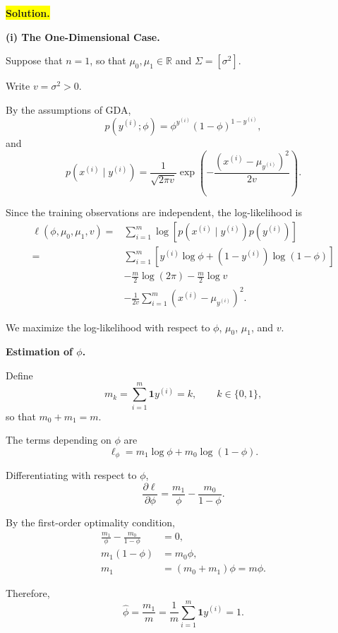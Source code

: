\documentclass[10pt]{article}
\newcommand{\ind}{\mathbf{1}}
\begin{document}
\begin{enumerate}
\begin{enumerate}[label=(\alph*)]

\medskip
\noindent\colorbox{yellow}{\textbf{Solution.}}

\medskip
\noindent\colorbox{yellow!20}{\textbf{(i) The One-Dimensional Case.}}

Suppose that $n=1$, so that
$\mu_0,\mu_1\in\mathbb{R}$ and
$\Sigma=[\sigma^2]$.

Write $v=\sigma^2>0$.

By the assumptions of GDA,
\[
p(y^{(i)};\phi)
=
\phi^{y^{(i)}}(1-\phi)^{1-y^{(i)}},
\]
and
\[
p(x^{(i)}\mid y^{(i)})
=
\frac{1}{\sqrt{2\pi v}}
\exp\left(
-\frac{
(x^{(i)}-\mu_{y^{(i)}})^2
}{2v}
\right).
\]

Since the training observations are independent,
the log-likelihood is
\[
\begin{aligned}
\ell(\phi,\mu_0,\mu_1,v)
={}&
\sum_{i=1}^{m}
\log\left[
p(x^{(i)}\mid y^{(i)})
p(y^{(i)})
\right]
\\[4pt]
={}&
\sum_{i=1}^{m}
\left[
y^{(i)}\log\phi
+
(1-y^{(i)})\log(1-\phi)
\right]
\\[4pt]
&-
\frac{m}{2}\log(2\pi)
-
\frac{m}{2}\log v
\\[4pt]
&-
\frac{1}{2v}
\sum_{i=1}^{m}
(x^{(i)}-\mu_{y^{(i)}})^2.
\end{aligned}
\]

We maximize the log-likelihood with respect to
$\phi$, $\mu_0$, $\mu_1$, and $v$.

\medskip
\noindent\colorbox{blue!20}{\textbf{Estimation of $\phi$.}}

Define
\[
m_k
=
\sum_{i=1}^{m}
\ind{y^{(i)}=k},
\qquad k\in\{0,1\},
\]
so that $m_0+m_1=m$.

The terms depending on $\phi$ are
\[
\ell_\phi
=
m_1\log\phi+m_0\log(1-\phi).
\]

Differentiating with respect to $\phi$,
\[
\frac{\partial\ell}{\partial\phi}
=
\frac{m_1}{\phi}
-
\frac{m_0}{1-\phi}.
\]

By the first-order optimality condition,
\[
\begin{aligned}
\frac{m_1}{\phi}
-
\frac{m_0}{1-\phi}
&=0,
\\[4pt]
m_1(1-\phi)
&=m_0\phi,
\\[4pt]
m_1
&=(m_0+m_1)\phi
=m\phi.
\end{aligned}
\]

Therefore,
\[
\boxed{
\hat{\phi}
=
\frac{m_1}{m}
=
\frac{1}{m}
\sum_{i=1}^{m}
\ind{y^{(i)}=1}.
}
\]


\end{enumerate}
\end{enumerate}
\end{document}
